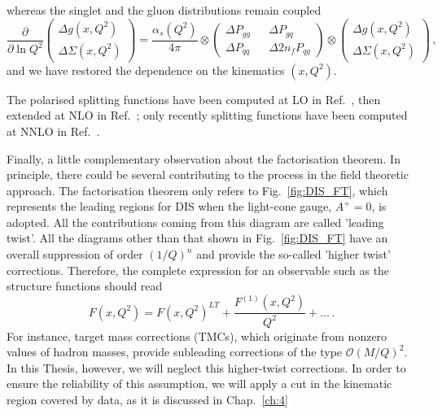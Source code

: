whereas the singlet and the gluon distributions remain coupled 
\begin{equation}
  \frac{\partial}{\partial \ln Q^2} 
  \left(\begin{matrix}
    \Delta g (x,Q^2)\\
    \Delta \Sigma (x,Q^2)
  \end{matrix} \right) 
  = \frac{\alpha_{s}(Q^2)}{4 \pi} \otimes
  \left(\begin{matrix}
    \Delta P_{gg} && \Delta P_{gq} \\
    \Delta P_{qq} && \Delta 2n_f P_{qg}
  \end{matrix} \right)
  \otimes 
  \left(\begin{matrix}
    \Delta g (x,Q^2) \\
    \Delta \Sigma (x,Q^2)
  \end{matrix} \right) \,,
\end{equation}
and we have restored the dependence on the kinematics $(x,Q^2)$.\par
The polarised splitting functions have been computed at LO in Ref.~\cite{Altarelli:1977zs}, then extended at NLO in Ref.~\cite{Mertig:1995ny, Vogelsang:1995vh}; only recently splitting functions have been computed at NNLO in Ref.~\cite{Moch:2014sna}.\par
Finally, a little complementary observation about the factorisation theorem. In principle, there could be several contributing to the process in the field theoretic approach. The factorisation theorem only refers to Fig.~\ref{fig:DIS_FT}, which represents the leading regions for DIS when the light-cone gauge, $A^{+}=0$, is adopted. All the contributions coming from this diagram are called 'leading twist'. All the diagrams other than that shown in Fig.~\ref{fig:DIS_FT} have an overall suppression of order $(1/Q)^{n}$ and provide the so-called 'higher twist' corrections. Therefore, the complete expression for an observable such as the structure functions should read
\begin{equation}
  F(x, Q^2) = F(x, Q^2)^{LT} + \frac{F^{(1)}(x,Q^2)}{Q^2} + \dots \,.
\end{equation}
For instance, target mass corrections (TMCs), which originate from nonzero values of hadron masses, provide subleading corrections of the type $\mathcal{O}(M/Q)^2$. In this Thesis, however, we will neglect this higher-twist corrections. In order to ensure the reliability of this assumption, we will apply a cut in the kinematic region covered by data, as it is discussed in Chap.~\ref{ch:4}

